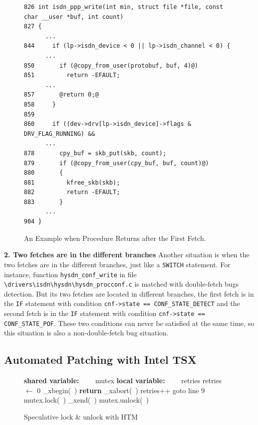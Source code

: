 \documentclass[10pt]{llncs}
\begin{document}
\begin{figure}[t]
  \centering
\begin{lstlisting}[style=code]
826 int isdn_ppp_write(int min, struct file *file, const char __user *buf, int count)
827 {
	  ...
844     if (lp->isdn_device < 0 || lp->isdn_channel < 0) {
	  ...
850       if (@copy_from_user(protobuf, buf, 4)@)
851         return -EFAULT;
	  ...
857       @return 0;@
858     }
859 
860     if ((dev->drv[lp->isdn_device]->flags & DRV_FLAG_RUNNING) &&
	  ...
878       cpy_buf = skb_put(skb, count);
879       if (@copy_from_user(cpy_buf, buf, count)@)
880       {
881         kfree_skb(skb);
882         return -EFAULT;
883       }
	  ...
904 } 
\end{lstlisting}
  \caption{An Example when Procedure Returns after the First Fetch.}
  \label{return}
\end{figure}

\textbf{2. Two fetches are in the different branches}
Another situation is when the two fetches are in the different branches, just like a \verb:SWITCH: statement. For instance, function \verb:hysdn_conf_write: in file \verb:\drivers\isdn\hysdn\hysdn_procconf.c: is matched with double-fetch bugs detection. But its two fetches are located in different branches, the first fetch is in the \verb:IF: statement with condition \verb:cnf->state == CONF_STATE_DETECT: and the second fetch is in the \verb:IF: statement with condition \verb:cnf->state == CONF_STATE_POF:. These two conditions can never be satisfied at the same time, so this situation is also a non-double-fetch bug situation.


\subsection{Automated Patching with Intel TSX}
\label{design2}

\begin{figure}[htb!]
\begin{algorithmic}[1]
\State \textbf{shared variable:} 
\State ~~~~mutex
\State 
\State \textbf{local variable:} 
\State ~~~~retries
\State
{}
  \State retries $\gets$ 0
  \State \_xbegin(~)  \label{line:xbegin}
  \State \textbf{return}
  \Else 
  \State \_xabort(~)
  \EndIf
  \State retries++
  \State goto line 9
  \Else
  \State mutex.lock(~) 
  \EndIf
\EndProcedure
\State
{}
\State \_xend(~)
\Else 
\State mutex.unlock(~)
\EndIf
\EndProcedure
\end{algorithmic}
\caption{Speculative lock \& unlock with HTM }
\label{speculative-lock}
\end{figure}
\end{document}
